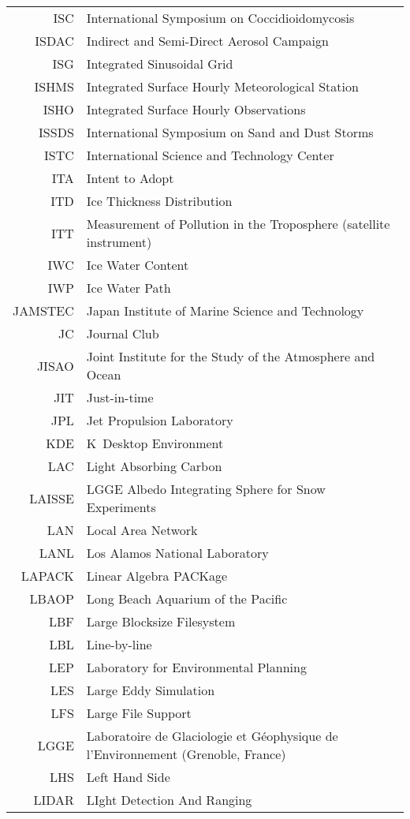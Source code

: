 \documentclass[12pt,twoside]{article}
\begin{document}
\begin{longtable}[>{\bfseries}l]{>{\ttfamily}r l}
ISC & International Symposium on Coccidioidomycosis \\
ISDAC & Indirect and Semi-Direct Aerosol Campaign \\
ISG & Integrated Sinusoidal Grid \\
ISHMS & Integrated Surface Hourly Meteorological Station \\
ISHO & Integrated Surface Hourly Observations \\
ISSDS & International Symposium on Sand and Dust Storms \\
ISTC & International Science and Technology Center \\
ITA & Intent to Adopt \\
ITD & Ice Thickness Distribution \\
ITT & Measurement of Pollution in the Troposphere (satellite instrument) \\
IWC & Ice Water Content \\
IWP & Ice Water Path \\
JAMSTEC & Japan Institute of Marine Science and Technology \\
JC & Journal Club \\
JISAO & Joint Institute for the Study of the Atmosphere and Ocean \\
JIT & Just-in-time \\
JPL & Jet Propulsion Laboratory \\
KDE & K~Desktop Environment \\
LAC & Light Absorbing Carbon \\
LAISSE & LGGE Albedo Integrating Sphere for Snow Experiments \\
LAN & Local Area Network \\
LANL & Los Alamos National Laboratory \\
LAPACK & Linear Algebra PACKage \\
LBAOP & Long Beach Aquarium of the Pacific \\
LBF & Large Blocksize Filesystem \\
LBL & Line-by-line \\
LEP & Laboratory for Environmental Planning \\
LES & Large Eddy Simulation \\
LFS & Large File Support \\
LGGE & Laboratoire de Glaciologie et G\'{e}ophysique de l'Environnement (Grenoble, France) \\
LHS & Left Hand Side \\
LIDAR & LIght Detection And Ranging \\

\end{longtable}
\end{document}
